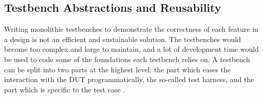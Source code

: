 \subsection{Testbench Abstractions and Reusability} %

Writing monolithic testbenches to demonstrate the correctness of each feature
in a design is not an efficient and sustainable solution. The testbenches would become too complex and large to
maintain, and a lot of development time would be
used to code some of the foundations each testbench relies on. A testbench can be split into two parts at the highest
level: the part which eases the interaction with the DUT programmatically, the so-called test harness, and the part
which is specific to the test case \cite[Ch. 6]{bergeron2012writing}.

